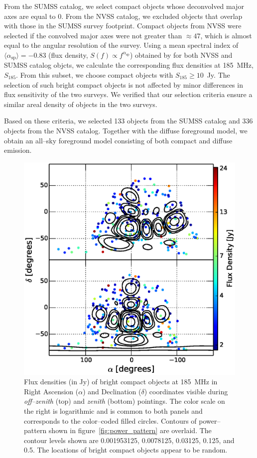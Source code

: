 \documentclass[preprint2,iop,numberedappendix]{emulateapj}
\begin{document}
From the SUMSS catalog, we select compact objects whose deconvolved major axes are equal to 0\arcsec. From the NVSS catalog, we excluded objects that overlap with those in the SUMSS survey footprint. Compact objects from NVSS were selected if the convolved major axes were not greater than $\approx 47$\arcsec, which is almost equal to the angular resolution of the survey. Using a mean spectral index of $\langle\alpha_\textrm{sp}\rangle=-0.83$ (flux density, $S(f)\propto f^{\alpha_\textrm{sp}}$) obtained by \citet{mau03} for both NVSS and SUMSS catalog objcts, we calculate the corresponding flux densities at 185~MHz, $S_{185}$. From this subset, we choose compact objects with $S_{185}\geq 10$~Jy. The selection of such bright compact objects is not affected by minor differences in flux sensitivity of the two surveys. We verified that our selection criteria ensure a similar areal density of objects in the two surveys. 

Based on these criteria, we selected 133 objects from the SUMSS catalog and 336 objects from the NVSS catalog. Together with the diffuse foreground model, we obtain an all--sky foreground model consisting of both compact and diffuse emission.

\begin{figure}[htb]
\centering
\includegraphics[width=\linewidth]{figures/v1_0/csm.eps}
\caption{Flux densities (in Jy) of bright compact objects at 185~MHz in Right Ascension ($\alpha$) and Declination ($\delta$) coordinates visible during {\it off--zenith} (top) and {\it zenith} (bottom) pointings. The color scale on the right is logarithmic and is common to both panels and corresponds to the color--coded filled circles. Contours of power--pattern shown in figure~\ref{fig:power_pattern} are overlaid. The contour levels shown are 0.001953125, 0.0078125, 0.03125, 0.125, and 0.5. The locations of bright compact objects appear to be random.\label{fig:CSM}}
\end{figure}
\end{document}
